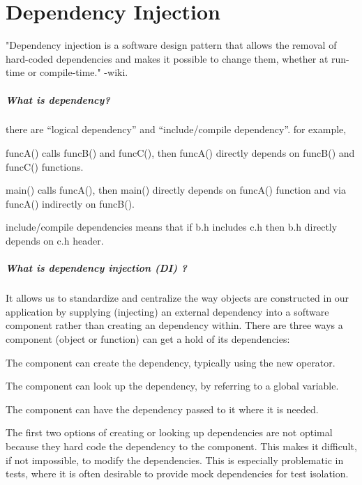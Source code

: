 \documentclass{book}
\begin{document}
\chapter{Dependency Injection}\label{DependencyInjectionPattern}
"Dependency injection is a software design pattern that allows the removal of hard-coded dependencies and makes it possible to change them, whether at run-time or compile-time."
-wiki.
\paragraph{What is dependency?} there are ``logical dependency'' and ``include/compile dependency''. for example,  

    funcA() calls funcB() and funcC(), then funcA() directly depends on funcB() and funcC() functions.

    main() calls funcA(), then main() directly depends on funcA() function and via funcA() indirectly on funcB().

include/compile dependencies means that if b.h includes c.h then b.h directly depends on c.h header.

\paragraph{What is dependency injection (DI) ?}
It allows us to standardize and centralize the way objects are constructed in our application 
by supplying (injecting) an external dependency into a software component
rather than creating an dependency within.
    There are three ways a component (object or function) can get a hold of its dependencies:

        The component can create the dependency, typically using the new operator.

        The component can look up the dependency, by referring to a global variable.

        The component can have the dependency passed to it where it is needed.

    The first two options of creating or looking up dependencies are not optimal because they hard code the dependency to the component.
    This makes it difficult, if not impossible, to modify the dependencies.
    This is especially problematic in tests, where it is often desirable to provide mock dependencies for test isolation.
\end{document}
